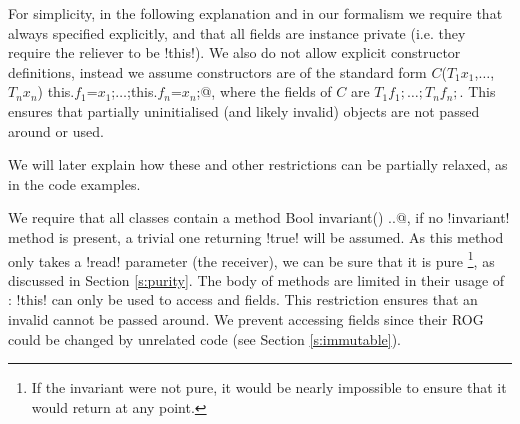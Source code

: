 For simplicity, in the following explanation and in our formalism
we require that 
 always specified explicitly, and that all fields are instance private (i.e. they require the reliever to be \Q!this!).
We also do not allow explicit constructor definitions, instead we assume constructors are of the standard form \Q@$C$($T_1 x_1$,$\ldots$,$T_n x_n$) {this.$f_1$=$x_1$;$\ldots$;this.$f_n$=$x_n$;}@, where the fields of $C$ are $T_1 f_1;\ldots; T_n f_n;$. This ensures that partially uninitialised (and likely invalid) objects are not passed around or used.

We will later explain how these and other restrictions can be partially relaxed, as in the code examples.

We require that all classes contain a \Q@read method Bool invariant() {..}@, if no \Q!invariant! method is present, a trivial one returning \Q!true! will be assumed. As this method only takes a \Q!read! parameter (the receiver), we can be sure that it is pure \footnote{If the invariant were not pure, it would be nearly impossible to ensure that it would return \Q@true@ at any point.}, as discussed in Section \ref{s:purity}.
The body of \Q@invariant@ methods are limited in their usage of \Q@this@: \Q!this! can only be used to access \Q@imm@ and \Q@capsule@ fields. This restriction ensures that 
an invalid \Q@this@ cannot be passed around.
We prevent accessing \Q@mut@ fields since their ROG could be changed by unrelated code (see Section \ref{s:immutable}).%

